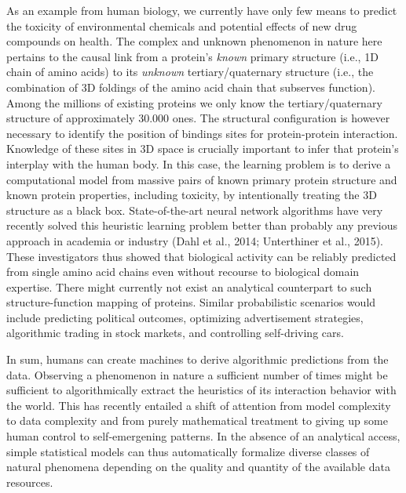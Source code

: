 \documentclass[authoryear,review,3p]{elsarticle}
\begin{document}
As an example from human biology,
we currently have only few means to predict the
toxicity of environmental chemicals and
potential effects of new drug compounds on health.
%
The complex and unknown phenomenon in nature here pertains
to the causal link from
a protein's \textit{known} primary structure
(i.e., 1D chain of amino acids)
to
its \textit{unknown} tertiary/quaternary structure
(i.e., the combination of 3D foldings
of the amino acid chain that subserves function).
%
Among the millions of existing proteins
we only know the tertiary/quaternary structure of
approximately 30.000 ones.
The structural configuration is however necessary to identify the position of
bindings sites for protein-protein interaction.
Knowledge of these sites in 3D space is crucially important
to infer that protein's interplay with the human body.
%
In this case,
the learning problem is to
derive a computational model from
massive pairs of known primary protein structure and
known protein properties, including toxicity,
by intentionally treating the 3D structure
as a black box.
%
State-of-the-art neural network algorithms
have very recently solved this heuristic learning problem
better than probably any previous approach in academia or industry
(Dahl et al., 2014; Unterthiner et al., 2015).
These investigators thus showed that biological activity
can be reliably predicted from single amino acid chains
even without recourse to biological domain expertise.
There might currently not exist
an analytical counterpart to such
structure-function mapping of proteins.
%
%
Similar probabilistic scenarios would include predicting
political outcomes,
optimizing advertisement strategies,
algorithmic trading in stock markets, and
controlling self-driving cars.

In sum,
humans can create machines to derive
algorithmic predictions from the data.
Observing a phenomenon in nature a sufficient number of times
might be sufficient to
algorithmically extract
the heuristics of its interaction behavior with the world.
This has recently entailed a shift
of attention
from model complexity to data complexity
and
from purely mathematical treatment to giving up some
human control to self-emergening patterns.
In the absence of an analytical access,
simple statistical models can thus automatically
formalize diverse classes of natural phenomena
depending on the quality and quantity of
the available data resources.
\end{document}
